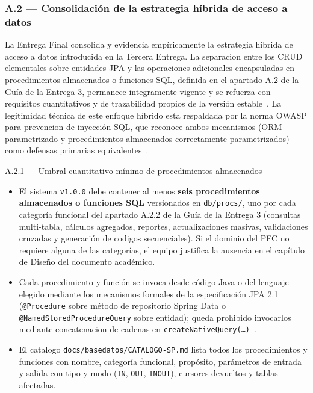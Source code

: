 \documentclass[11pt,a4paper]{article}
\begin{document}
\subsubsection*{A.2 --- Consolidaci\'{o}n de la estrategia h\'{i}brida de acceso a datos}

La Entrega Final consolida y evidencia emp\'{i}ricamente la estrategia h\'{i}brida de acceso a datos introducida en la Tercera Entrega. La separacion entre los CRUD elementales sobre entidades JPA y las operaciones adicionales encapsuladas en procedimientos almacenados o funciones SQL, definida en el apartado A.2 de la Gu\'{i}a de la Entrega 3, permanece integramente vigente y se refuerza con requisitos cuantitativos y de trazabilidad propios de la versi\'{o}n estable~\cite{demichiel2013jpa21,springdata2025procedures,fowler2002patterns}. La legitimidad t\'{e}cnica de este enfoque h\'{i}brido esta respaldada por la norma OWASP para prevencion de inyecci\'{o}n SQL, que reconoce ambos mecanismos (ORM parametrizado y procedimientos almacenados correctamente parametrizados) como defensas primarias equivalentes~\cite{owaspsqlicheatsheet}.

\begin{cajarepo}{A.2.1 --- Umbral cuantitativo m\'{i}nimo de procedimientos almacenados}
    \begin{itemize}
        \item El sistema \texttt{v1.0.0} debe contener al menos \textbf{seis procedimientos almacenados o funciones SQL} versionados en \texttt{db/procs/}, uno por cada categor\'{i}a funcional del apartado A.2.2 de la Gu\'{i}a de la Entrega 3 (consultas multi-tabla, c\'{a}lculos agregados, reportes, actualizaciones masivas, validaciones cruzadas y generaci\'{o}n de codigos secuenciales). Si el dominio del PFC no requiere alguna de las categor\'{i}as, el equipo justifica la ausencia en el cap\'{i}tulo de Dise\~{n}o del documento acad\'{e}mico.
        \item Cada procedimiento y funci\'{o}n se invoca desde c\'{o}digo Java o del lenguaje elegido mediante los mecanismos formales de la especificaci\'{o}n JPA 2.1 (\texttt{@Procedure} sobre m\'{e}todo de repositorio Spring Data o \texttt{@NamedStoredProcedureQuery} sobre entidad); queda prohibido invocarlos mediante concatenacion de cadenas en \texttt{createNativeQuery(\ldots)}~\cite{demichiel2013jpa21,springdata2025procedures}.
        \item El catalogo \texttt{docs/basedatos/CATALOGO-SP.md} lista todos los procedimientos y funciones con nombre, categor\'{i}a funcional, prop\'{o}sito, par\'{a}metros de entrada y salida con tipo y modo (\texttt{IN}, \texttt{OUT}, \texttt{INOUT}), cursores devueltos y tablas afectadas.
    \end{itemize}
\end{cajarepo}
\end{document}
